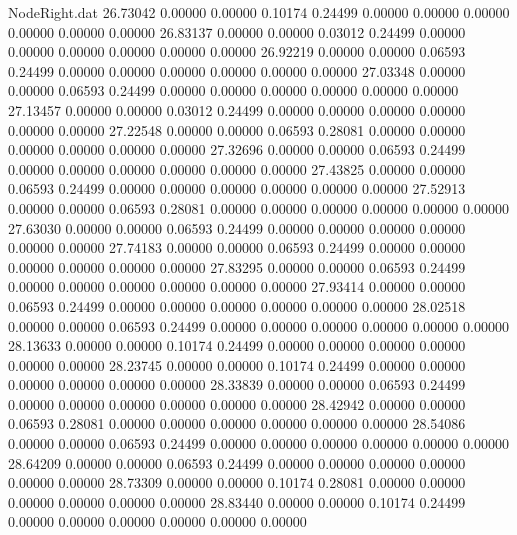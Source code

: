 \begin{filecontents}{NodeRight.dat}
  26.73042    0.00000    0.00000     0.10174    0.24499    0.00000    0.00000    0.00000    0.00000    0.00000    0.00000
  26.83137    0.00000    0.00000     0.03012    0.24499    0.00000    0.00000    0.00000    0.00000    0.00000    0.00000
  26.92219    0.00000    0.00000     0.06593    0.24499    0.00000    0.00000    0.00000    0.00000    0.00000    0.00000
  27.03348    0.00000    0.00000     0.06593    0.24499    0.00000    0.00000    0.00000    0.00000    0.00000    0.00000
  27.13457    0.00000    0.00000     0.03012    0.24499    0.00000    0.00000    0.00000    0.00000    0.00000    0.00000
  27.22548    0.00000    0.00000     0.06593    0.28081    0.00000    0.00000    0.00000    0.00000    0.00000    0.00000
  27.32696    0.00000    0.00000     0.06593    0.24499    0.00000    0.00000    0.00000    0.00000    0.00000    0.00000
  27.43825    0.00000    0.00000     0.06593    0.24499    0.00000    0.00000    0.00000    0.00000    0.00000    0.00000
  27.52913    0.00000    0.00000     0.06593    0.28081    0.00000    0.00000    0.00000    0.00000    0.00000    0.00000
  27.63030    0.00000    0.00000     0.06593    0.24499    0.00000    0.00000    0.00000    0.00000    0.00000    0.00000
  27.74183    0.00000    0.00000     0.06593    0.24499    0.00000    0.00000    0.00000    0.00000    0.00000    0.00000
  27.83295    0.00000    0.00000     0.06593    0.24499    0.00000    0.00000    0.00000    0.00000    0.00000    0.00000
  27.93414    0.00000    0.00000     0.06593    0.24499    0.00000    0.00000    0.00000    0.00000    0.00000    0.00000
  28.02518    0.00000    0.00000     0.06593    0.24499    0.00000    0.00000    0.00000    0.00000    0.00000    0.00000
  28.13633    0.00000    0.00000     0.10174    0.24499    0.00000    0.00000    0.00000    0.00000    0.00000    0.00000
  28.23745    0.00000    0.00000     0.10174    0.24499    0.00000    0.00000    0.00000    0.00000    0.00000    0.00000
  28.33839    0.00000    0.00000     0.06593    0.24499    0.00000    0.00000    0.00000    0.00000    0.00000    0.00000
  28.42942    0.00000    0.00000     0.06593    0.28081    0.00000    0.00000    0.00000    0.00000    0.00000    0.00000
  28.54086    0.00000    0.00000     0.06593    0.24499    0.00000    0.00000    0.00000    0.00000    0.00000    0.00000
  28.64209    0.00000    0.00000     0.06593    0.24499    0.00000    0.00000    0.00000    0.00000    0.00000    0.00000
  28.73309    0.00000    0.00000     0.10174    0.28081    0.00000    0.00000    0.00000    0.00000    0.00000    0.00000
  28.83440    0.00000    0.00000     0.10174    0.24499    0.00000    0.00000    0.00000    0.00000    0.00000    0.00000

\end{filecontents}

